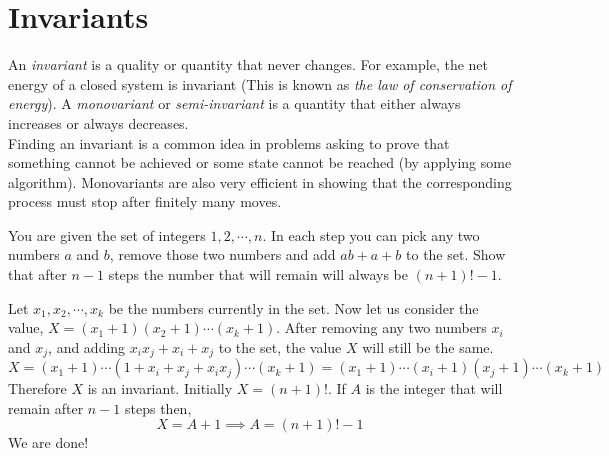 \chapter{Invariants}

An \emph{invariant} is a quality or quantity that never changes. 
For example, the net energy of a closed system is invariant 
(This is known as \emph{the law of conservation of energy}). 
A \emph{monovariant} or \emph{semi-invariant} is a quantity 
that either always increases or always decreases. \\
Finding an invariant is a common idea in problems asking to prove that 
something cannot be achieved or some state cannot be reached (by applying some algorithm). 
Monovariants are also very efficient in showing that the corresponding process must stop after finitely many moves.

\begin{problem}
    You are given the set of integers $1, 2, \cdots, n$. 
    In each step you can pick any two numbers $a$ and $b$, 
    remove those two numbers and add $ab+a+b$ to the set. 
    Show that after $n-1$ steps the number that will remain will always be $(n+1)! -1$.
\end{problem}
\begin{sol}
    Let $x_{1}, x_{2}, \cdots, x_{k}$ be the numbers currently in the set. 
    Now let us consider the value, $X = (x_{1}+1)(x_{2}+1)\cdots (x_{k}+1)$. 
    After removing any two numbers $x_{i}$ and $x_{j}$, and adding 
    $x_{i}x_{j} + x_{i} + x_{j}$ to the set, the value $X$ will still be the same.
    \[
        X = (x_{1} + 1) \cdots (1 + x_{i} + x_{j} + x_{i}x_{j}) \cdots (x_{k} + 1) 
          = (x_{1} + 1) \cdots (x_{i} + 1) (x_{j} + 1) \cdots (x_{k} + 1)
    \]
    Therefore $X$ is an invariant. Initially $X=(n+1)!$. If $A$ is the integer 
    that will remain after $n-1$ steps then, 
    \[
        X = A+1 \implies A = (n+1)! - 1
    \]
    We are done!
\end{sol}

